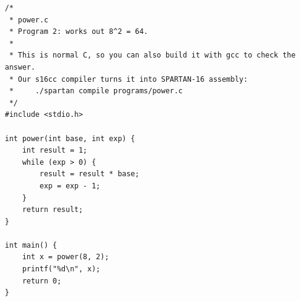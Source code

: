 \begin{lstlisting}[style=csrc]
/*
 * power.c
 * Program 2: works out 8^2 = 64.
 *
 * This is normal C, so you can also build it with gcc to check the answer.
 * Our s16cc compiler turns it into SPARTAN-16 assembly:
 *     ./spartan compile programs/power.c
 */
#include <stdio.h>

int power(int base, int exp) {
    int result = 1;
    while (exp > 0) {
        result = result * base;
        exp = exp - 1;
    }
    return result;
}

int main() {
    int x = power(8, 2);
    printf("%d\n", x);
    return 0;
}
\end{lstlisting}
